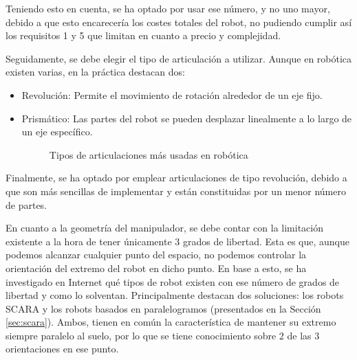 Teniendo esto en cuenta, se ha optado por usar ese número, y no uno mayor, debido a que esto encarecería los costes totales del robot, no pudiendo cumplir así 
los requisitos 1 y 5 que limitan en cuanto a precio y complejidad. 

Seguidamente, se debe elegir el tipo de articulación a utilizar. Aunque en robótica existen varias, en la práctica destacan dos:
\begin{itemize}
\item Revolución: Permite el movimiento de rotación alrededor de un eje fijo.
\item Prismático: Las partes del robot se pueden desplazar linealmente a lo largo de un eje específico. 

\begin{figure} [h!]
  \centering    
  \hspace{1cm}
  \caption{Tipos de articulaciones más usadas en robótica}
\end{figure}

\end{itemize}

Finalmente, se ha optado por emplear articulaciones de tipo revolución, debido a que son más sencillas de implementar y 
están constituidas por un menor número de partes.

En cuanto a la geometría del manipulador, se debe contar con la limitación existente a la hora de tener únicamente 3 grados de libertad. Esta es 
que, aunque podemos alcanzar cualquier punto del espacio, no podemos controlar la orientación del extremo del robot en dicho punto. En base a esto, 
se ha investigado en Internet qué tipos de robot existen con ese número de grados de libertad y como lo solventan. Principalmente destacan dos 
soluciones: los robots SCARA y los robots basados en paralelogramos (presentados en la Sección \ref{sec:scara}). Ambos, tienen en común la 
característica de mantener su extremo siempre paralelo al suelo, por lo que se tiene conocimiento sobre 2 de las 3 orientaciones en ese punto. 


